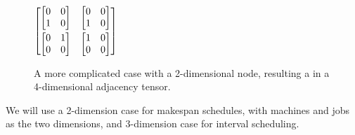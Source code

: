 \begin{figure}[H]
	\begin{center}
		\begin{minipage}{0.3\textwidth}
			\begin{center}
			\end{center}
		\end{minipage}
		\begin{minipage}{0.3\textwidth}
			\begin{center}
				$\begin{bmatrix}
					\begin{bmatrix}
						0&0\\
						1&0\\
					\end{bmatrix}&
					\begin{bmatrix}
						0&0\\
						1&0\\
					\end{bmatrix}\vspace{0.1cm}\\
					\begin{bmatrix}
						0&1\\
						0&0\\
						\end{bmatrix}&
						\begin{bmatrix}
						1&0\\
						0&0\\
						\end{bmatrix}\\
				\end{bmatrix}$
			\end{center}
		\end{minipage}
		
	\end{center}
	\caption{A more complicated case with a 2-dimensional node, resulting a in a 4-dimensional adjacency tensor.}
\end{figure}

We will use a 2-dimension case for makespan schedules, with machines and jobs as the two dimensions, and 3-dimension case for interval scheduling.

